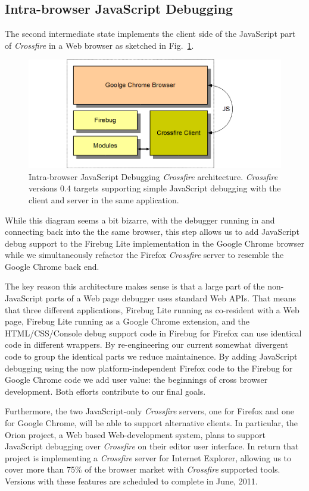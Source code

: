 \subsection{Intra-browser JavaScript Debugging}
The second intermediate state implements the client side of the JavaScript part
of \textit{Crossfire} in a Web browser as sketched in Fig.~\ref{fig:fbugChrome}.
\begin{figure}[htp]
  \includegraphics  [width = 86 mm] {figures/fbugChrome}
  \caption{Intra-browser JavaScript Debugging \textit{Crossfire} architecture.
\textit{Crossfire} versions 0.4 targets supporting simple JavaScript debugging with the client and server in the same application.}
 \label{fig:fbugChrome}
\end{figure}
While this diagram seems a bit bizarre, with the debugger running in and
connecting back into the the same browser, this step allows us to add JavaScript
debug support to the Firebug Lite implementation in the Google Chrome browser
while we simultaneously refactor the Firefox  \textit{Crossfire} server to
resemble the Google Chrome back end.


The key reason this architecture makes sense is that a large part of the
non-JavaScript parts of a Web page debugger uses standard Web APIs. That  means
that three different applications, Firebug Lite running as co-resident with a
Web page, Firebug Lite running as a Google Chrome extension,  and the
HTML/CSS/Console debug support code in Firebug for Firefox can use identical
code in different wrappers. By re-engineering our current somewhat divergent
code to group the identical parts we reduce maintainence. By adding
JavaScript debugging using the now platform-independent Firefox code to the
Firebug for Google Chrome code we add user value: the beginnings of cross
browser development. Both efforts contribute to our final goals.


Furthermore, the two JavaScript-only \textit{Crossfire} servers, one for Firefox
and one for Google Chrome, will be able to support alternative clients. In
particular, the Orion project, a Web based Web-development system, plans to
support JavaScript debugging over \textit{Crossfire} on their editor user
interface. In return that project is implementing a \textit{Crossfire} server
for Internet Explorer, allowing us to cover more than 75\% of the browser market
with \textit{Crossfire} supported tools. Versions with these features are scheduled
 to complete in
June, 2011.


